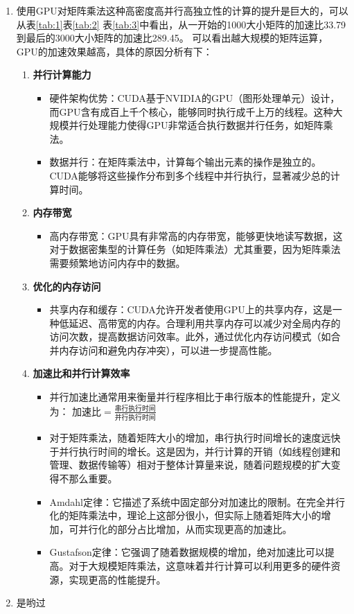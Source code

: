 \documentclass{article}
\begin{document}
\begin{enumerate}
    \item 使用GPU对矩阵乘法这种高密度高并行高独立性的计算的提升是巨大的，可以从表\ref{tab:1}表\ref{tab:2}
    表\ref{tab:3}中看出，从一开始的1000大小矩阵的加速比33.79到最后的3000大小矩阵的加速比289.45。
    可以看出越大规模的矩阵运算，GPU的加速效果越高，具体的原因分析有下：
    \begin{enumerate}
        \item \textbf{并行计算能力}
        \begin{itemize}
          \item 硬件架构优势：CUDA基于NVIDIA的GPU（图形处理单元）设计，而GPU含有成百上千个核心，能够同时执行成千上万的线程。这种大规模并行处理能力使得GPU非常适合执行数据并行任务，如矩阵乘法。
          \item 数据并行：在矩阵乘法中，计算每个输出元素的操作是独立的。CUDA能够将这些操作分布到多个线程中并行执行，显著减少总的计算时间。
        \end{itemize}
      
        \item \textbf{内存带宽}
        \begin{itemize}
          \item 高内存带宽：GPU具有非常高的内存带宽，能够更快地读写数据，这对于数据密集型的计算任务（如矩阵乘法）尤其重要，因为矩阵乘法需要频繁地访问内存中的数据。
        \end{itemize}
      
        \item \textbf{优化的内存访问}
        \begin{itemize}
          \item 共享内存和缓存：CUDA允许开发者使用GPU上的共享内存，这是一种低延迟、高带宽的内存。合理利用共享内存可以减少对全局内存的访问次数，提高数据访问效率。此外，通过优化内存访问模式（如合并内存访问和避免内存冲突），可以进一步提高性能。
        \end{itemize}
      
        \item \textbf{加速比和并行计算效率}
        \begin{itemize}
          \item 并行加速比通常用来衡量并行程序相比于串行版本的性能提升，定义为：
          $ 加速比 = \frac{串行执行时间}{并行执行时间} $
          \item 对于矩阵乘法，随着矩阵大小的增加，串行执行时间增长的速度远快于并行执行时间的增长。这是因为，并行计算的开销（如线程创建和管理、数据传输等）相对于整体计算量来说，随着问题规模的扩大变得不那么重要。
          \item Amdahl定律：它描述了系统中固定部分对加速比的限制。在完全并行化的矩阵乘法中，理论上这部分很小，但实际上随着矩阵大小的增加，可并行化的部分占比增加，从而实现更高的加速比。
          \item Gustafson定律：它强调了随着数据规模的增加，绝对加速比可以提高。对于大规模矩阵乘法，这意味着并行计算可以利用更多的硬件资源，实现更高的性能提升。
        \end{itemize}
      \end{enumerate}
      \item 是哟过
\end{enumerate}
\end{document}
